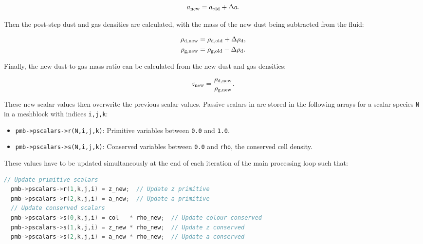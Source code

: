 \begin{equation}
  \label{eq:anewupdate}
  a_\text{new} = a_\text{old} + \Delta a .
\end{equation}

\noindent
Then the post-step dust and gas densities are calculated, with the mass of the new dust being subtracted from the fluid:

\begin{subequations}
  \begin{align}
    \rho_\text{d,new} & = \rho_\text{d,old} + \Delta \rho_\text{d} , \label{eq:newdustdensity} \\
    \rho_\text{g,new} & = \rho_\text{g,old} - \Delta \rho_\text{d} \label{eq:newgasdensity}. 
  \end{align}
\end{subequations}

\noindent
Finally, the new dust-to-gas mass ratio can be calculated from the new dust and gas densities:

\begin{equation}
  \label{eq:znewupdate}
  z_\text{new} = \frac{\rho_\text{d,new}}{\rho_\text{g,new}} . 
\end{equation}

\noindent
These new scalar values then overwrite the previous scalar values.
Passive scalars in \athena{} are stored in the following arrays for a scalar species \texttt{N} in a meshblock with indices \texttt{i,j,k}:

\begin{itemize}
  \item \texttt{pmb->pscalars->r(N,i,j,k)}: Primitive variables between \texttt{0.0} and \texttt{1.0}.
  \item \texttt{pmb->pscalars->s(N,i,j,k)}: Conserved variables between \texttt{0.0} and \texttt{rho}, the conserved cell density.
\end{itemize}

\noindent
These values have to be updated simultaneously at the end of each iteration of the main processing loop such that:

\begin{lstlisting}[language=c++]
  // Update primitive scalars
  pmb->pscalars->r(1,k,j,i) = z_new;  // Update z primitive
  pmb->pscalars->r(2,k,j,i) = a_new;  // Update a primitive
  // Update conserved scalars 
  pmb->pscalars->s(0,k,j,i) = col   * rho_new;  // Update colour conserved
  pmb->pscalars->s(1,k,j,i) = z_new * rho_new;  // Update z conserved
  pmb->pscalars->s(2,k,j,i) = a_new * rho_new;  // Update a conserved
\end{lstlisting}

